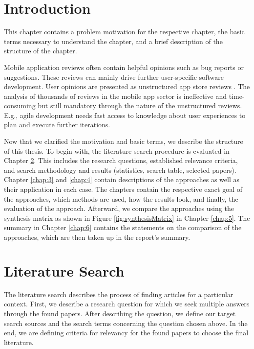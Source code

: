\chapter{Introduction}
This chapter contains a problem motivation for the respective chapter, the basic terms necessary to understand the chapter, and a brief description of the structure of the chapter.

Mobile application reviews often contain helpful opinions such as bug reports or suggestions. These reviews can mainly drive further user-specific software development. User opinions are presented as unstructured app store reviews \cite{Vu, Guzman}. The  analysis of thousands of reviews in the mobile app sector is ineffective and time-consuming but still mandatory through the nature of the unstructured reviews. E.g., agile development needs fast access to knowledge about user experiences to plan and execute further iterations.

Now that we clarified the motivation and basic terms, we describe the structure of this thesis. To begin with, the literature search procedure is evaluated in Chapter \ref{chap:2}. This includes the research questions, established relevance criteria, and search methodology and results (statistics, search table, selected papers). Chapter \ref{chap:3} and \ref{chap:4} contain descriptions of the approaches as well as their application in each case. The chapters contain the respective exact goal of the approaches, which methods are used, how the results look, and finally, the evaluation of the approach. Afterward, we compare the approaches using the synthesis matrix as shown in Figure \ref{fig:synthesisMatrix} in Chapter \ref{chap:5}. The summary in Chapter \ref{chap:6} contains the statements on the comparison of the approaches, which are then taken up in the report's summary.

\chapter{Literature Search}
\label{chap:2}

The literature search describes the process of finding articles for a particular context. First, we describe a research question for which we seek multiple answers through the found papers. After describing the question, we define our target search sources and the search terms concerning the question chosen above. In the end, we are defining criteria for relevancy for the found papers to choose the final literature.

